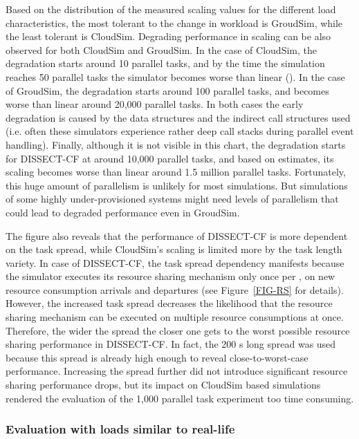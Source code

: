\documentclass[sort, compress, 5p]{elsarticle}
\newcommand{\SMALLESTIMEGRANULARITY}{}
\begin{document}
Based on the distribution of the measured scaling values for the different load characteristics, the most tolerant to the change in workload is GroudSim, while the least tolerant is CloudSim. Degrading performance in scaling can be also observed for both CloudSim and GroudSim. In the case of CloudSim, the degradation starts around 10 parallel tasks, and by the time the simulation reaches 50 parallel tasks the simulator becomes worse than linear (). In the case of GroudSim, the degradation starts around 100 parallel tasks, and becomes worse than linear around 20,000 parallel tasks. In both cases the early degradation is caused by the data structures and the indirect call structures used (i.e. often these simulators experience rather deep call stacks during parallel event handling). Finally, although it is not visible in this chart, the degradation starts for DISSECT-CF at around 10,000 parallel tasks, and based on estimates, its scaling becomes worse than linear around 1.5 million parallel tasks. Fortunately, this huge amount of parallelism is unlikely for most simulations. But simulations of some highly under-provisioned systems might need levels of parallelism that could lead to degraded performance even in GroudSim.

The figure also reveals that the performance of DISSECT-CF is more dependent on the task spread, while CloudSim's scaling is limited more by the task length variety. In case of DISSECT-CF, the task spread dependency manifests because the simulator executes its resource sharing mechanism only once per \SMALLESTIMEGRANULARITY, on new resource consumption arrivals and departures (see Figure~\ref{FIG-RS} for details). However, the increased task spread decreases the likelihood that the resource sharing mechanism can be executed on multiple resource consumptions at once. Therefore, the wider the spread the closer one gets to the worst possible resource sharing performance in DISSECT-CF. In fact, the 200 s long spread was used because this spread is already high enough to reveal close-to-worst-case performance. Increasing the spread further did not introduce significant resource sharing performance drops, but its impact on CloudSim based simulations rendered the evaluation of the 1,000 parallel task experiment too time consuming.

\subsubsection{Evaluation with loads similar to real-life}
\end{document}
